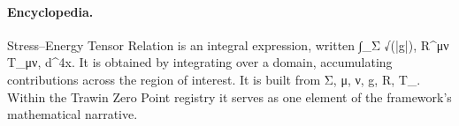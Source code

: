 \paragraph{Encyclopedia.}
Stress–Energy Tensor Relation is an integral expression, written ∫\_Σ √(|g|), R\textasciicircum{}μν T\_μν, d\textasciicircum{}4x. It is obtained by integrating over a domain, accumulating contributions across the region of interest. It is built from Σ, μ, ν, g, R, T\_. Within the Trawin Zero Point registry it serves as one element of the framework's mathematical narrative.
